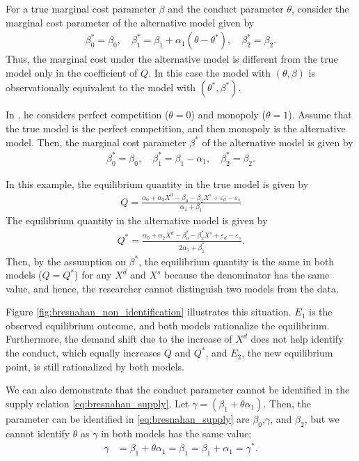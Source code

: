 \documentclass[11pt, a4paper]{article}
\theoremstyle{remark}
\begin{document}
For a true marginal cost parameter $\beta$ and the conduct parameter $\theta$, consider the marginal cost parameter of the alternative model given by
\begin{align}
    \beta_0^{*} = \beta_0, \quad \beta_1^{*} = \beta_1 + \alpha_1(\theta - \theta^{*}), \quad \beta_2^{*} = \beta_2.
\end{align}
Thus, the marginal cost under the alternative model is different from the true model only in the coefficient of $Q$.
In this case the model with $(\theta, \beta)$ is observationally equivalent to the model with $(\theta^{*}, \beta^{*})$.


In \citet{bresnahan1982oligopoly}, he considers perfect competition ($\theta = 0$) and monopoly ($\theta = 1$).
Assume that the true model is the perfect competition, and then monopoly is the alternative model.
Then, the marginal cost parameter $\beta^{*}$ of the alternative model is given by
\begin{align}
    \beta_0^{*} = \beta_0, \quad \beta_1^{*} = \beta_1 - \alpha_1, \quad \beta_2^{*} = \beta_2.
\end{align}

In this example, the equilibrium quantity in the true model is given by
\begin{align}
    Q = \frac{\alpha_0 + \alpha_2 X^d - \beta_0 - \beta_2 X^s + \varepsilon_d - \varepsilon_s}{\alpha_1 + \beta_1}
\end{align}
The equilibrium quantity in the alternative model is given by
\begin{align}
    Q^{*} = \frac{\alpha_0 + \alpha_2 X^d - \beta_0^{*} - \beta_2^{*} X^s + \varepsilon_d - \varepsilon_s}{2\alpha_1 + \beta_1^{*}}.
\end{align}
Then, by the assumption on $\beta^{*}$, the equilibrium quantity is the same in both models ($Q = Q^{*}$) for any $X^d$ and $X^s$ because the denominator has the same value, and hence, the researcher cannot distinguish two models from the data.

Figure \ref{fig:bresnahan_non_identification} illustrates this situation.
$E_1$ is the observed equilibrium outcome, and both models rationalize the equilibrium.
Furthermore, the demand shift due to the increase of $X^d$ does not help identify the conduct, which equally increases $Q$ and $Q^{*}$, and $E_2$, the new equilibrium point, is still rationalized by both models.

We can also demonstrate that the conduct parameter cannot be identified in the supply relation \eqref{eq:bresnahan_supply}.
Let $\gamma = (\beta_1 + \theta \alpha_1)$.
Then, the parameter can be identified  in \eqref{eq:bresnahan_supply} are $\beta_0$,$\gamma$, and $\beta_2$, but we cannot identify $\theta$ as $\gamma$ in both models has the same value; 
\begin{align}
    \gamma &= \beta_1 + \theta \alpha_1 = \beta_1 = \beta_1 + \alpha_1 = \gamma^{*}.
\end{align}
\end{document}
